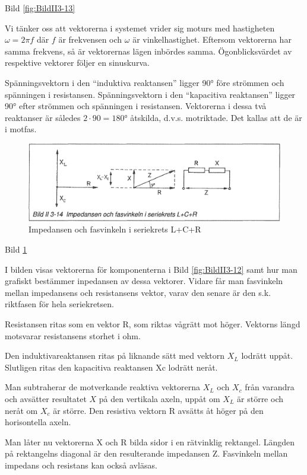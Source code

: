 Bild \ref{fig:BildII3-13}

Vi tänker oss att vektorerna i systemet vrider sig moturs med hastigheten
\(\omega = 2πf\) där \(f\) är frekvensen och \(\omega\) är vinkelhastighet.
Eftersom vektorerna har samma frekvens, så är vektorernas lägen inbördes samma.
Ögonblicksvärdet av respektive vektorer följer en sinuskurva.

Spänningsvektorn i den ``induktiva reaktansen'' ligger 90° före strömmen och
spänningen i resistansen. Spänningsvektorn i den ``kapacitiva reaktansen''
ligger 90° efter strömmen och spänningen i resistansen. Vektorerna i dessa två
reaktanser är således \(2 \cdot 90 = 180°\) åtskilda, d.v.s. motriktade.
Det kallas att de är i motfas.

\begin{figure}
\includegraphics[width=\textwidth]{images/bild_2_3-14}
\caption{Impedansen och fasvinkeln i seriekrets L+C+R}
\label{fig:BildII3-14}
\end{figure}

Bild \ref{fig:BildII3-14}

I bilden visas vektorerna för komponenterna i Bild \ref{fig:BildII3-12} samt
hur man grafiskt bestämmer inpedansen av dessa vektorer. Vidare får man
fasvinkeln mellan impedansens och resistansens vektor, varav den senare är den
s.k. riktfasen för hela seriekretsen.

Resistansen ritas som en vektor R, som riktas vågrätt mot höger. Vektorns längd
motsvarar resistansens storhet i ohm.

Den induktivareaktansen ritas på liknande sätt med vektorn \(X_L\) lodrätt
uppåt. Slutligen ritas den kapacitiva reaktansen Xc lodrätt neråt.

Man subtraherar de motverkande reaktiva vektorerna \(X_L\) och \(X_c\) från
varandra och avsätter resultatet \(X\) på den vertikala axeln, uppåt om \(X_L\)
är större och neråt om \(X_c\) är större. Den resistiva vektorn R avsätts åt
höger på den horisontella axeln.

Man låter nu vektorerna X och R bilda sidor i en rätvinklig rektangel. Längden
på rektangelns diagonal är den resulterande impedansen Z. Fasvinkeln mellan
impedans och resistans kan också avläsas.

